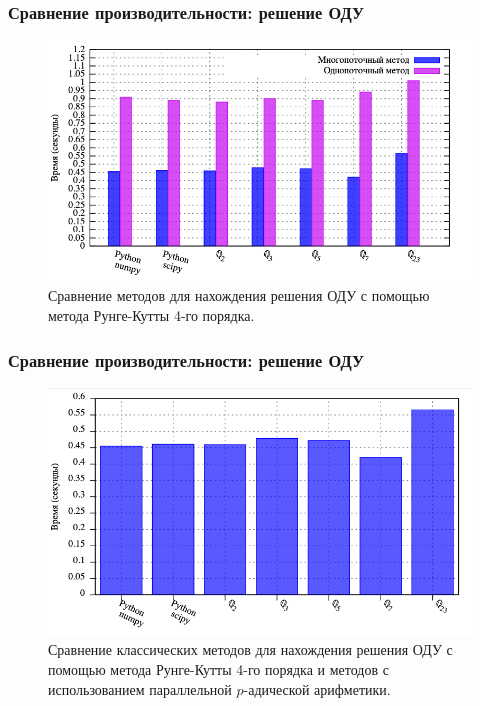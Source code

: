 \documentclass[10pt,professionalfont,utf8,presentation,compress]{beamer}
\theoremstyle{definition}
\theoremstyle{plain}
\begin{document}
\begin{frame}
\frametitle{Сравнение производительности: решение ОДУ}
\begin{figure}[H]
\centerline{\includegraphics[width=0.95\linewidth]{../gnuplot/multi/rk/plot.png}}
\caption{Сравнение методов для нахождения решения ОДУ с помощью метода Рунге-Кутты 4-го порядка.}
\label{img:comp:ode:rk}
\end{figure}
\end{frame}

\begin{frame}
\frametitle{Сравнение производительности: решение ОДУ}
\begin{figure}[H]
\centerline{\includegraphics[width=0.95\linewidth]{../gnuplot/multi/rk/multi.png}}
\caption{Сравнение классических методов для нахождения решения ОДУ с помощью метода Рунге-Кутты 4-го порядка и методов с использованием параллельной $p$-адической арифметики.}
\label{img:comp:ode:rk:multi}
\end{figure}
\end{frame}
\end{document}
